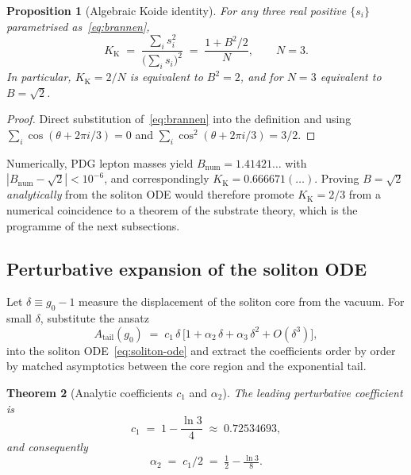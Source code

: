 \documentclass[11pt,a4paper]{article}
\newcommand{\Atail}{A_{\mathrm{tail}}}
\newcommand{\Kkoide}{K_{\mathrm{K}}}
\newtheorem{theorem}{Theorem}
\newtheorem{proposition}[theorem]{Proposition}
\begin{document}
\begin{proposition}[Algebraic Koide identity]\label{prop:koide-alg}
For any three real positive $\{s_{i}\}$ parametrised
as~\eqref{eq:brannen},
\begin{equation}\label{eq:koide-identity}
  \Kkoide \;=\; \frac{\sum_{i} s_{i}^{2}}{\bigl(\sum_{i} s_{i}\bigr)^{2}}
  \;=\; \frac{1 + B^{2}/2}{N},
  \qquad N=3.
\end{equation}
In particular, $\Kkoide=2/N$ is equivalent to $B^{2}=2$, and for
$N=3$ equivalent to $B=\sqrt{2}$.
\end{proposition}

\begin{proof}
Direct substitution of~\eqref{eq:brannen} into the definition and using
$\sum_{i}\cos(\theta+2\pi i/3)=0$ and
$\sum_{i}\cos^{2}(\theta+2\pi i/3)=3/2$.
\end{proof}

\noindent
Numerically, PDG lepton masses yield
$B_{\mathrm{num}}=1.41421\ldots$ with $|B_{\mathrm{num}}-\sqrt{2}|<10^{-6}$,
and correspondingly $\Kkoide=0.666671(\ldots)$. Proving $B=\sqrt{2}$
\emph{analytically} from the soliton ODE would therefore promote
$\Kkoide=2/3$ from a numerical coincidence to a theorem of the
substrate theory, which is the programme of the next subsections.

\subsection{Perturbative expansion of the soliton ODE}

Let $\delta\!\equiv\!g_{0}-1$ measure the displacement of the soliton
core from the vacuum. For small $\delta$, substitute the ansatz
\begin{equation}\label{eq:ansatz-expand}
  \Atail(g_{0}) \;=\; c_{1}\,\delta\,\bigl[
    1 + \alpha_{2}\,\delta + \alpha_{3}\,\delta^{2} + O(\delta^{3})
  \bigr],
\end{equation}
into the soliton ODE~\eqref{eq:soliton-ode} and extract the coefficients
order by order by matched asymptotics between the core region and the
exponential tail.

\begin{theorem}[Analytic coefficients $c_{1}$ and $\alpha_{2}$]\label{thm:c1-alpha2}
The leading perturbative coefficient is
\begin{equation}\label{eq:c1}
  c_{1} \;=\; 1 - \frac{\ln 3}{4} \;\approx\; 0.72534693,
\end{equation}
and consequently
\begin{equation}\label{eq:alpha2}
  \alpha_{2} \;=\; c_{1}/2 \;=\; \tfrac{1}{2} - \tfrac{\ln 3}{8}.
\end{equation}
\end{theorem}
\end{document}
